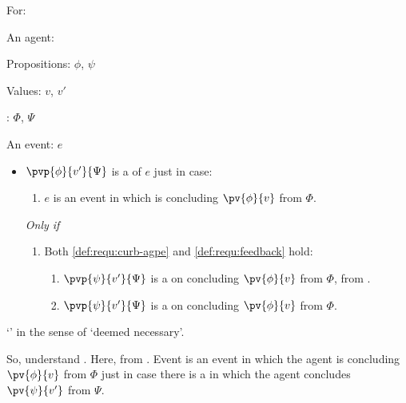 \begin{note}
  \begin{definition}[A \requ{0}]
    \label{def:requ}
    For:

    \begin{itemize*}[noitemsep]
    \item
      An agent: \vAgent{}
    \item
      Propositions: \(\phi\), \(\psi\)
    \item
      Values: \(v\), \(v'\)
    \item
      : \(\Phi\), \(\Psi\)
    \item
      An event: \(e\)
    \end{itemize*}

    \begin{itemize}
    \item
    \(\pvp{\phi}{v'}{\Psi}\) is a \emph{\requ{}} of \(e\) just in case:

    \begin{enumerate}[label=\alph*., ref=(\alph*), series=requDefSeries]
      \item
        \(e\) is an event in which \vAgent{} is concluding \(\pv{\phi}{v}\) from \(\Phi\).
      \end{enumerate}

    \emph{Only if}

    \begin{enumerate}[label=\alph*., ref=(\alph*), resume*=requDefSeries]
    \item
      Both \ref{def:requ:curb-agpe} and \ref{def:requ:feedback} hold:
      \begin{enumerate}[label=\roman*., ref=(\roman*)]
      \item
        \label{def:requ:curb-agpe}
        \(\pvp{\psi}{v'}{\Psi}\) is a \curb{} on concluding \(\pv{\phi}{v}\) from \(\Phi\), from .
      \item
        \label{def:requ:feedback}
        \(\pvp{\psi}{v'}{\Psi}\) is a \curb{} on concluding \(\pv{\phi}{v}\) from \(\Phi\).%
      \end{enumerate}
    \end{enumerate}
  \end{itemize}
  \vspace{-\baselineskip}
  \end{definition}

  `' in the sense of `deemed necessary'.

  So, understand \requ{}.
  Here, from \agpe{}.
  Event is an event in which the agent is concluding \(\pv{\phi}{v}\) from \(\Phi\) just in case there is a \pevent{} in which the agent concludes \(\pv{\psi}{v'}\) from \(\Psi\).


\end{note}
